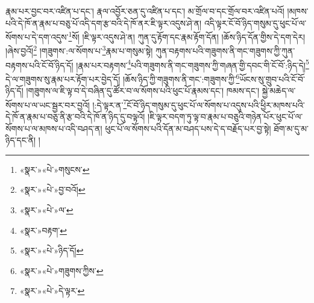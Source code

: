 རྣམ་པར་བྱང་བར་འཛིན་པ་དང་། རྣལ་འབྱོར་ཅན་དུ་འཛིན་པ་དང་། མ་གྲོལ་བ་དང་གྲོལ་བར་འཛིན་པའོ། །མཁས་པའི་དེ་ཁོ་ན་རྣམ་པ་བཅུ་པོ་འདི་དག་རྩ་བའི་དེ་ཁོ་ནར་ཇི་ལྟར་འདུས་ཤེ་ན། འདི་ལྟར་ངོ་བོ་ཉིད་གསུམ་དུ་ཕུང་པོ་ལ་སོགས་པ་དེ་དག་འདུས་\footnote{«སྣར་»«པེ་»གསུངས་}སོ། །ཇི་ལྟར་འདུས་ཤེ་ན། ཀུན་དུ་རྟོག་དང་རྣམ་རྟོག་དོན། །ཆོས་ཉིད་དོན་གྱིས་དེ་དག་དེར། །ཞེས་བྱའོ།\footnote{«སྣར་»«པེ་»བྱ་བའོ།} །གཟུགས་:ལ་སོགས་པ་\footnote{«སྣར་»«པེ་»ལ་}རྣམ་པ་གསུམ་སྟེ། ཀུན་བརྟགས་པའི་གཟུགས་ནི་གང་གཟུགས་ཀྱི་ཀུན་བརྟགས་པའི་ངོ་བོ་ཉིད་དོ། །རྣམ་པར་བརྟགས་\footnote{«སྣར་»བརྟག་}པའི་གཟུགས་ནི་གང་གཟུགས་ཀྱི་གཞན་གྱི་དབང་གི་ངོ་བོ་:ཉིད་དེ།\footnote{«སྣར་»«པེ་»ཉིད་དོ།} དེ་ལ་གཟུགས་སུ་རྣམ་པར་རྟོག་པར་བྱེད་དོ། །ཆོས་ཉིད་ཀྱི་གཟུགས་ནི་གང་:གཟུགས་ཀྱི་\footnote{«སྣར་»«པེ་»གཟུགས་ཀྱིས་}ཡོངས་སུ་གྲུབ་པའི་ངོ་བོ་ཉིད་དོ། །གཟུགས་ལ་ཇི་ལྟ་བ་དེ་བཞིན་དུ་ཚོར་བ་ལ་སོགས་པའི་ཕུང་པོ་རྣམས་དང་། ཁམས་དང་། སྐྱེ་མཆེད་ལ་སོགས་པ་ལ་ཡང་སྦྱར་བར་བྱའོ། །:དེ་ལྟར་ན་\footnote{«སྣར་»«པེ་»དེ་ལྟར་}ངོ་བོ་ཉིད་གསུམ་དུ་ཕུང་པོ་ལ་སོགས་པ་འདུས་པའི་ཕྱིར་མཁས་པའི་དེ་ཁོ་ན་རྣམ་པ་བཅུ་ནི་རྩ་བའི་དེ་ཁོ་ན་ཉིད་དུ་བལྟའོ། །ཇི་ལྟར་བདག་ཏུ་ལྟ་བ་རྣམ་པ་བཅུའི་གཉེན་པོར་ཕུང་པོ་ལ་སོགས་པ་ལ་མཁས་པ་འདི་བཤད་ན། ཕུང་པོ་ལ་སོགས་པའི་དོན་མ་བཤད་པས་དེ་ད་བརྗོད་པར་བྱ་སྟེ། ཐོག་མ་དུ་མ་ཉིད་དང་ནི། །
